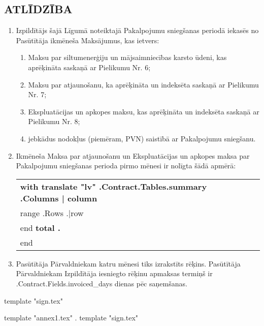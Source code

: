 \subsection{ATLĪDZĪBA}
\begin{enumerate}
	\item Izpildītājs šajā Līgumā noteiktajā Pakalpojumu sniegšanas periodā iekasēs no Pasūtītāja ikmēneša Maksājumus, kas ietvers:
	\begin{enumerate}
		\item Maksu par siltumenerģiju un mājsaimniecības karsto ūdeni, kas aprēķināta saskaņā ar Pielikumu Nr.  6;
		\item Maksu par atjaunošanu, ka aprēķināta un indeksēta saskaņā ar Pielikumu Nr.  7;
		\item Ekspluatācijas un apkopes maksu, kas aprēķināta un indeksēta saskaņā ar Pielikumu Nr.  8;
		\item jebkādus nodokļus (piemēram, PVN) saistībā ar Pakalpojumu sniegšanu.
	\end{enumerate}
	\item Ikmēneša Maksa par atjaunošanu un Ekspluatācijas un apkopes maksa par Pakalpojumu sniegšanas perioda pirmo mēnesi ir nolīgta šādā apmērā:


\begin{center}
	\begin{tabu}{|X|X|X|X|}\tabucline{}\rowfont[c]\bfseries
	{{with translate "lv" .Contract.Tables.summary}} %
	{{.Columns | column}} \\\tabucline{}
	{{range .Rows}} %
	{{.|row}} \\\tabucline{}
	{{end}}
	\bfseries {{total .}} \\\tabucline{} %
	{{end}}
	\end{tabu}
\end{center}

\item Pasūtītāja Pārvaldniekam katru mēnesi tiks izrakstīts rēķins. Pasūtītāja Pārvaldniekam Izpildītāja iesniegto rēķinu apmaksas termiņš ir \iffalse input fields.invoiced_days value="{{.Contract.Fields.invoiced_days}}" \fi {{.Contract.Fields.invoiced_days}} dienas pēc saņemšanas.
\end{enumerate}

\vspace{2cm}
{{template "sign.tex"}} %

{{template "annex1.tex" .}} %
{{template "sign.tex"}} %

